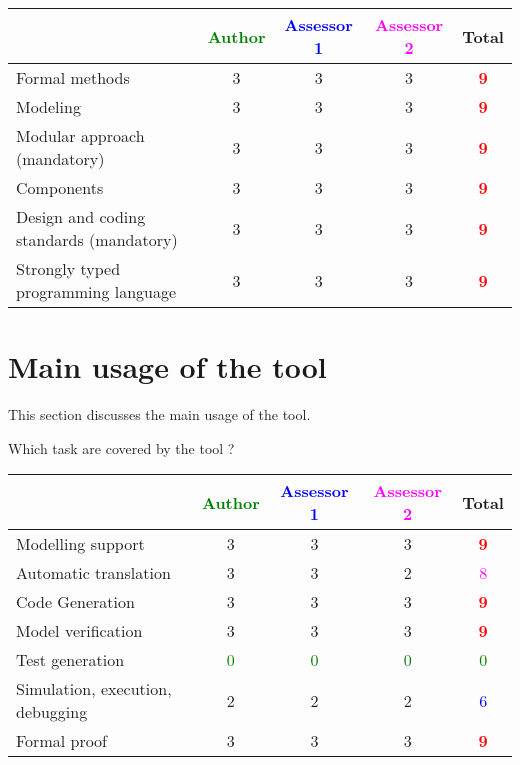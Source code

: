 \begin{tabular}{|l | c | c | c | c|}
\hline
& \textcolor{green}{Author} & \textcolor{blue}{Assessor 1} & \textcolor{magenta}{Assessor 2} & Total \\
\hline
Formal methods  & 3    & 3    & 3    & \textcolor{red}{\textbf{9}} \\
\hline 
Modeling  & 3    & 3    & 3    & \textcolor{red}{\textbf{9}} \\
\hline
Modular approach (mandatory) & 3    & 3    & 3    & \textcolor{red}{\textbf{9}} \\
\hline
Components & 3    & 3    & 3    & \textcolor{red}{\textbf{9}} \\
\hline
Design and coding standards (mandatory) & 3    & 3    & 3    & \textcolor{red}{\textbf{9}} \\
\hline
Strongly typed programming language & 3    & 3    & 3    & \textcolor{red}{\textbf{9}} \\
\hline

\end{tabular}



\section{Main usage of the tool}
\label{main_usage}

This section discusses the main usage of the tool.

Which task are covered by the tool ?


\begin{tabular}{|l | c | c | c | c|}
\hline
& \textcolor{green}{Author} & \textcolor{blue}{Assessor 1} & \textcolor{magenta}{Assessor 2} & Total \\
\hline 
Modelling support & 3    & 3    & 3    & \textcolor{red}{\textbf{9}} \\
\hline
Automatic translation  & 3    & 3    & 2    & \textcolor{magenta}{8} \\
\hline
Code Generation  & 3    & 3    & 3    & \textcolor{red}{\textbf{9}} \\
\hline
Model verification & 3    & 3    & 3     & \textcolor{red}{\textbf{9}} \\
\hline
Test generation & \textcolor{green}{0} & \textcolor{green}{0} & \textcolor{green}{0} & \textcolor{green}{0} \\
\hline
Simulation, execution, debugging & 2     & 2    & 2    & \textcolor{blue}{6} \\
\hline
Formal proof & 3    & 3    & 3    & \textcolor{red}{\textbf{9}} \\
\hline
\end{tabular}

